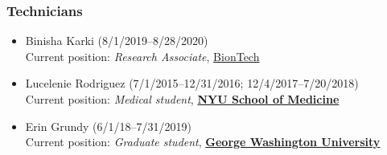 \documentclass[10pt]{article}
\begin{document}
\subsubsection*{Technicians}

\begin{itemize}
  \item Binisha Karki (8/1/2019--8/28/2020)\\
  Current position: \emph{Research Associate}, \href{http://biontech.de}{BionTech}

  \item Lucelenie Rodriguez (7/1/2015--12/31/2016; 12/4/2017--7/20/2018)\\
  Current position: \emph{Medical student}, \href{https://med.nyu.edu/education}{\bf NYU School of Medicine}

  \item Erin Grundy (6/1/18--7/31/2019)\\
  Current position: \emph{Graduate student}, \href{https://smhs.gwu.edu/ibs/program/microbio-immunology}{\bf George Washington University}
\end{itemize}


\end{document}
